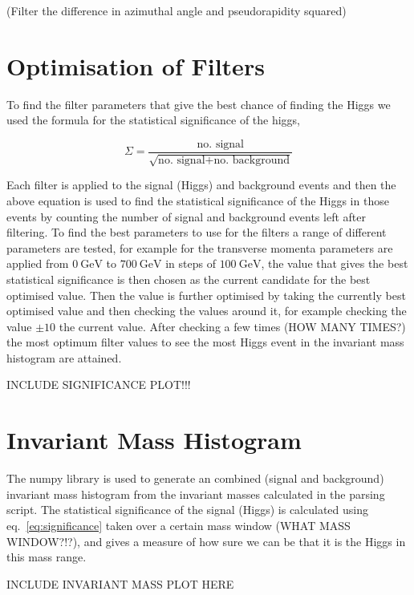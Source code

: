 \documentclass[11pt]{amsart}
\begin{document}
\begin{multicols}{2}
(Filter the difference in azimuthal angle and pseudorapidity squared)


\section{Optimisation of Filters}

To find the filter parameters that give the best chance of finding the Higgs we used the formula for the statistical significance of the higgs,

\begin{equation}
  \label{eq:significance}
  \Sigma = \frac{\text{no. signal}}{\sqrt{\text{no. signal} + \text{no. background}}}
\end{equation}

Each filter is applied to the signal (Higgs) and background events and then the above equation is used to find the statistical significance of the Higgs in those events by counting the number of signal and background events left after filtering. To find the best parameters to use for the filters a range of different parameters are tested, for example for the transverse momenta parameters are applied from $\SI{0}{\giga\electronvolt}$ to $\SI{700}{\giga\electronvolt}$ in steps of $\SI{100}{\giga\electronvolt}$, the value that gives the best statistical significance is then chosen as the current candidate for the best optimised value. Then the value is further optimised by taking the currently best optimised value and then checking the values around it, for example checking the value $\pm 10$ the current value. After checking a few times (HOW MANY TIMES?) the most optimum filter values to see the most Higgs event in the invariant mass histogram are attained.

INCLUDE SIGNIFICANCE PLOT!!!


\section{Invariant Mass Histogram}

The numpy library is used to generate an combined (signal and background) invariant mass histogram from the invariant masses calculated in the parsing script. The statistical significance of the signal (Higgs) is calculated using eq.~\ref{eq:significance} taken over a certain mass window (WHAT MASS WINDOW?!?), and gives a measure of how sure we can be that it is the Higgs in this mass range.

INCLUDE INVARIANT MASS PLOT HERE

\end{multicols}



\end{document}
